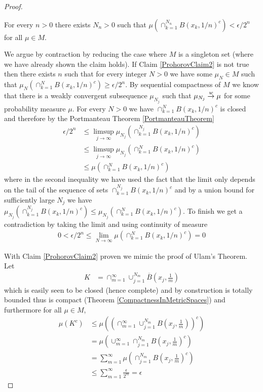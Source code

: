 \begin{proof}
\begin{clm}\label{ProhorovClaim2}For every $n > 0$ there exists $N_n > 0$ such that $\mu(\cap_{k=1}^{N_{n}}
B(x_k, 1/n)^c ) < \epsilon/2^n$ for all $\mu \in M$.
 \end{clm}

We argue by contraction by reducing the case where $M$ is a singleton
set (where we have already shown the claim holds).  If Claim \ref{ProhorovClaim2} is not
true then there exists $n$ such that for every integer $N>0$ we have
some $\mu_N \in M$ such that $\mu_N(\cap_{k=1}^{N} B(x_k, 1/n)^c )
\geq \epsilon/2^n$.  By sequential compactness of $M$ we know that
there is a weakly convergent subsequence $\mu_{N_j}$ such that
$\mu_{N_j} \overset{w}\to \mu$ for some probability measure $\mu$.  For every
$N > 0$ we have $\cap_{k=1}^{N} B(x_k, 1/n)^c$ is closed and therefore
by the Portmanteau Theorem \ref {PortmanteauTheorem}
\begin{align*}
\epsilon/2^n &\leq \limsup_{j \to \infty} \mu_{N_j}(\cap_{k=1}^{N_j}
B(x_k, 1/n)^c) \\
&\leq \limsup_{j \to \infty} \mu_{N_j}(\cap_{k=1}^{N} B(x_k, 1/n)^c)
\\
&\leq \mu(\cap_{k=1}^{N} B(x_k, 1/n)^c)
\end{align*}
where in the second inequality we have used the fact that the limit
only depends on the tail of the sequence of sets $\cap_{k=1}^{N_j}
B(x_k, 1/n)^c$ and by a union bound for sufficiently large $N_j$ we
have $\mu_{N_j}(\cap_{k=1}^{N_j} B(x_k, 1/n)^c)  \leq
\mu_{N_j}(\cap_{k=1}^{N} B(x_k, 1/n)^c)$.  To finish we get a
contradiction by taking the 
limit and using continuity of measure
\begin{align*}
0 < \epsilon/2^n \leq \lim_{N \to \infty} \mu(\cap_{k=1}^{N} B(x_k,
1/n)^c) = 0
\end{align*}

With Claim \ref{ProhorovClaim2} proven we mimic the proof of Ulam's Theorem.  Let 
\begin{align*}
K &=
\cap_{m=1}^\infty \cup_{j=1}^{N_m} \overline{B}(x_j,\frac{1}{m})
\end{align*}
which is easily seen to be closed (hence complete) and by construction
is totally bounded thus is compact (Theorem
\ref{CompactnessInMetricSpaces})
and furthermore for all $\mu \in M$,
\begin{align*}
\mu(K^c) &\leq \mu((\cap_{m=1}^\infty
\cup_{j=1}^{N_m} B(x_j,\frac{1}{m}))^c) \\
&=\mu(\cup_{m=1}^\infty 
\cap_{j=1}^{N_m} B(x_j,\frac{1}{m})^c) \\
&=\sum_{m=1}^\infty \mu(
\cap_{j=1}^{N_m} B(x_j,\frac{1}{m})^c) \\
&\leq \sum_{m=1}^\infty \frac{\epsilon}{2^m} = \epsilon
\end{align*}

\end{proof}

